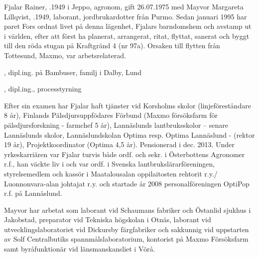 %



%
Fjalar Rainer, .1949 i Jeppo, agronom, gift 26.07.1975 med Mayvor Margareta Lillqvist, .1949, laborant, jordbrukardotter från Purmo. Sedan januari 1995 har paret Fors ordnat livet på denna lägenhet, Fjalars barndomshem och avstamp ut i världen, efter att först ha planerat, arrangerat, ritat, flyttat, sanerat och	byggt till den röda stugan på Kraftgränd 4 (nr 97a). Orsaken till flytten från Tottesund, Maxmo, var arbetsrelaterad.
\begin{jhchildren}
  \item {}, dipl.ing. på Bambuser, familj i Dalby, Lund
  \item {}, dipl.ing., processtyrning
\end{jhchildren}

Efter sin examen har Fjalar haft tjänster vid Korsholms skolor (linjeföreståndare 8 år), Finlands Pälsdjursuppfödares Förbund (Maxmo försöksfarm för pälsdjursforskning - farmchef 5 år), Lannäslunds lantbruksskolor -- senare Lannäslunds skolor, Lannäslundskolan Optima resp. Optima Lannäslund - (rektor 19 år), Projektkoordinator (Optima 4,5 år).	Pensionerad i dec. 2013. Under yrkeskarriären var Fjalar turvis både ordf. och sekr. i Österbottens Agronomer r.f., han väckte liv i och var ordf. i Svenska lantbrukslärarföreningen, styrelsemedlem och kassör i Maatalousalan oppilaitosten rehtorit r.y./ Luonnonvara-alan johtajat r.y. och startade år 2008 personalföreningen OptiPop r.f. på Lannäslund.

Mayvor har arbetat som laborant vid Schaumans fabriker och Östanlid sjukhus i Jakobstad, preparator vid Tekniska högskolan i Otnäs, laborant vid utvecklingslaboratoriet vid Dickursby färgfabriker och sakkunnig vid uppstarten av Solf Centralbutiks spannmålslaboratorium, kontorist på Maxmo Försöksfarm samt byråfunktionär vid länsmanskansliet i Vörå.

